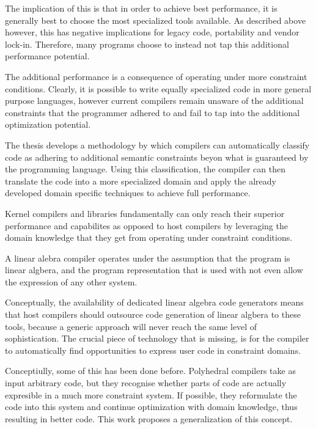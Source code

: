     The implication of this is that in order to achieve best performance, it is
    generally best to choose the most specialized tools available.
    As described above however, this has negative implications for legacy code,
    portability and vendor lock-in.
    Therefore, many programs choose to instead not tap this additional
    performance potential.

    The additional performance is a consequence of operating under more
    constraint conditions.
    Clearly, it is possible to write equally specialized code in more general
    purpose languages, however current compilers remain unaware of the
    additional constraints that the programmer adhered to and fail to tap into
    the additional optimization potential.

    The thesis develops a methodology by which compilers can automatically
    classify code as adhering to additional semantic constraints beyon what is
    guaranteed by the programming language.
    Using this classification, the compiler can then translate the code into a
    more specialized domain and apply the already developed domain specific
    techniques to achieve full performance.


    Kernel compilers and libraries fundamentally can only reach their superior
    performance and capabilites as opposed to host compilers by leveraging the
    domain knowledge that they get from operating under constraint conditions.
    
    A linear alebra compiler operates under the assumption that the program is
    linear algbera, and the program representation that is used with not even
    allow the expression of any other system.

    Conceptually, the availability of dedicated linear algebra code generators
    means that host compilers should outsource code generation of linear algbera
    to these tools, because a generic approach will never reach the same level
    of sophistication.
    The crucial piece of technology that is missing, is for the compiler to
    automatically find opportunities to express user code in constraint
    domains.

    Conceptiully, some of this has been done before.
    Polyhedral compilers take as input arbitrary code, but they recognise whether
    parts of code are actually expresible in a much more constraint system.
    If possible, they reformulate the code into this system and continue
    optimization with domain knowledge, thus resulting in better code.
    This work proposes a generalization of this concept.

